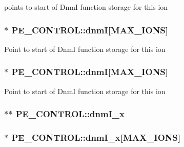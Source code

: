 points to start of Dnm\-I function storage for this ion \hypertarget{struct_p_e___c_o_n_t_r_o_l_a1de3604b0d3ac79589b49e16aac02030}{
\subsubsection[{dnm\-I}]{$\ast$ P\-E\-\_\-\-C\-O\-N\-T\-R\-O\-L\-::dnm\-I\mbox{[}{\bf M\-A\-X\-\_\-\-I\-O\-N\-S}\mbox{]}}}\label{struct_p_e___c_o_n_t_r_o_l_a1de3604b0d3ac79589b49e16aac02030}
Point to start of Dnm\-I function storage for this ion \hypertarget{struct_p_e___c_o_n_t_r_o_l_acd28b835c2d7dd53f82c150ea5a28189}{
\subsubsection[{dnm\-I}]{$\ast$ P\-E\-\_\-\-C\-O\-N\-T\-R\-O\-L\-::dnm\-I\mbox{[}{\bf M\-A\-X\-\_\-\-I\-O\-N\-S}\mbox{]}}}\label{struct_p_e___c_o_n_t_r_o_l_acd28b835c2d7dd53f82c150ea5a28189}
Point to start of Dnm\-I function storage for this ion \hypertarget{struct_p_e___c_o_n_t_r_o_l_aa793d34ee52468de0bfb76513bceea76}{
\subsubsection[{dnm\-I\-\_\-x}]{$\ast$$\ast$ P\-E\-\_\-\-C\-O\-N\-T\-R\-O\-L\-::dnm\-I\-\_\-x}}\label{struct_p_e___c_o_n_t_r_o_l_aa793d34ee52468de0bfb76513bceea76}
\hypertarget{struct_p_e___c_o_n_t_r_o_l_a1e193f496fdba1f5dd510147394ac255}{
\subsubsection[{dnm\-I\-\_\-x}]{$\ast$ P\-E\-\_\-\-C\-O\-N\-T\-R\-O\-L\-::dnm\-I\-\_\-x\mbox{[}{\bf M\-A\-X\-\_\-\-I\-O\-N\-S}\mbox{]}}}\label{struct_p_e___c_o_n_t_r_o_l_a1e193f496fdba1f5dd510147394ac255}

